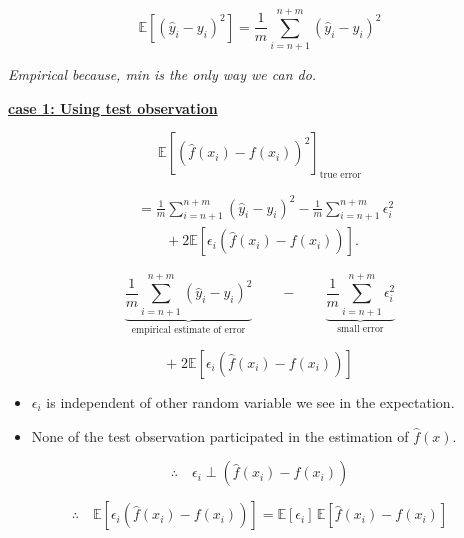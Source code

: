 \documentclass{article}
\begin{document}
\newpage


\[
\boxed{
	\mathbb{E}\left[(\hat{y}_i-y_i)^2\right]
	=
	\frac{1}{m}
	\sum_{i=n+1}^{n+m}
	(\hat{y}_i-y_i)^2
}
\]

\hfill
\textit{Empirical because, min is the only way we can do.}

\vspace{0.4cm}

\underline{\textbf{case 1: Using test observation}}

\vspace{0.2cm}

\[
\mathbb{E}
\left[
\left(\hat{f}(x_i)-f(x_i)\right)^2
\right]
_{\text{true error}}
\]

\begin{align*}
	&=
	\frac{1}{m}
	\sum_{i=n+1}^{n+m}
	(\hat{y}_i-y_i)^2
	-
	\frac{1}{m}
	\sum_{i=n+1}^{n+m}
	\epsilon_i^2
	\\
	&\qquad
	+
	2\mathbb{E}
	\left[
	\epsilon_i
	\left(
	\hat{f}(x_i)-f(x_i)
	\right)
	\right].
\end{align*}

\vspace{0.3cm}

\[
\underbrace{
	\frac{1}{m}
	\sum_{i=n+1}^{n+m}
	(\hat{y}_i-y_i)^2
}_{\text{empirical estimate of error}}
\qquad
-
\qquad
\underbrace{
	\frac{1}{m}
	\sum_{i=n+1}^{n+m}
	\epsilon_i^2
}_{\text{small error}}
\]

\vspace{0.3cm}

\[
+
\;2\mathbb{E}
\left[
\epsilon_i
\left(
\hat{f}(x_i)-f(x_i)
\right)
\right]
\]

\begin{itemize}[leftmargin=1.2cm]
	
	\item $\epsilon_i$ is independent of other random variable we see in the
	expectation.
	
	\item None of the test observation participated in the estimation of
	$\hat{f}(x)$.
	
\end{itemize}

\[
\therefore\quad
\epsilon_i
\perp
\left(
\hat{f}(x_i)-f(x_i)
\right)
\]

\[
\therefore\quad
\mathbb{E}
\left[
\epsilon_i
\left(
\hat{f}(x_i)-f(x_i)
\right)
\right]
=
\mathbb{E}[\epsilon_i]\,
\mathbb{E}
\left[
\hat{f}(x_i)-f(x_i)
\right]
\]
\end{document}
